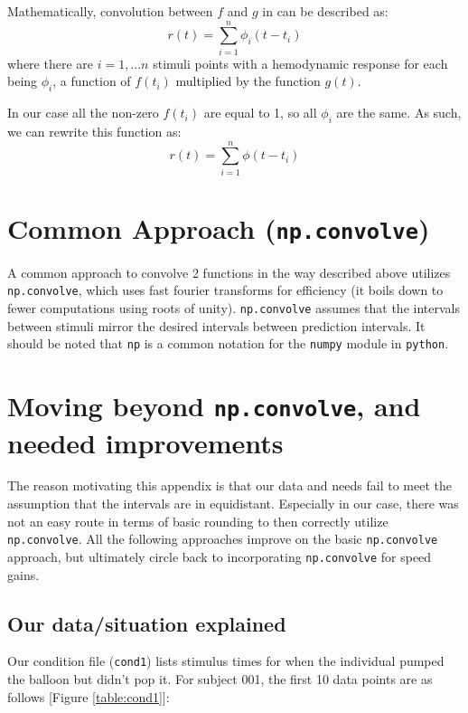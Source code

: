 \documentclass[11pt]{article}
\begin{document}
Mathematically, convolution between $f$ and $g$ in can be described as:
\begin{equation}  \label{eq:standard_convolve}
r(t)= \sum_{i=1}^n \phi_{i}(t-t_i)
\end{equation}
where there are $i=1,...n$ stimuli points with a hemodynamic response for each 
being $\phi_i$, a function of $f(t_i)$ multiplied by the function $g(t)$.

In our case all the non-zero $f(t_i)$ are equal to 1, so all $\phi_i$ are the same. As such, we can rewrite this function as:
\begin{equation} \label{eq:generalized_hrf}
r(t) =\sum_{i=1}^n \phi (t-t_i)
\end{equation}

\section{Common Approach (\texttt{np.convolve})}

A common approach to convolve 2 functions in the way described above 
utilizes \texttt{np.convolve}, which uses fast fourier transforms for 
efficiency (it boils down to fewer computations using roots of unity). 
\texttt{np.convolve} assumes that the intervals between stimuli mirror the 
desired intervals between prediction intervals. It should be noted that 
\texttt{np} is a common notation for the \texttt{numpy} module in 
\texttt{python}.

\section{Moving beyond \texttt{np.convolve}, and needed improvements}

The reason motivating this appendix is that our data and needs fail to meet 
the assumption that the intervals are in equidistant. Especially in our case, 
there was not an easy route in terms of basic rounding to then correctly utilize 
\texttt{np.convolve}. All the following approaches improve on the basic 
\texttt{np.convolve} approach, but ultimately circle back to incorporating 
\texttt{np.convolve} for speed gains. 

\subsection{Our data/situation explained}
Our condition file (\texttt{cond1}) lists stimulus times for when the 
individual pumped the balloon but didn't pop it. For subject 001, the 
first 10 data points are as follows [Figure \ref{table:cond1}]:
\end{document}
